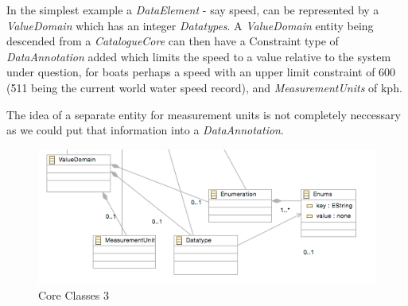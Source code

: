\documentclass{article}
\begin{document}
In the simplest example a \emph{DataElement} - say speed, can be represented by a \emph{ValueDomain} which has an integer \emph{Datatypes}. A  \emph{ValueDomain} entity being descended from a \emph{CatalogueCore} can then have a Constraint type of \emph{DataAnnotation} added which limits the speed to a value relative to the system under question, for boats perhaps a speed with an upper limit constraint of 600 (511 being the current world water speed record), and \emph{MeasurementUnits} of kph. 

The idea of a separate entity for measurement units is not completely neccessary as we could put that information into a \emph{DataAnnotation}.


\begin{figure}[here]
\includegraphics[scale=0.4]{images/core3}
\caption{Core Classes 3} 
\label{fig:core3}
\end{figure}



\newpage




\end{document}
